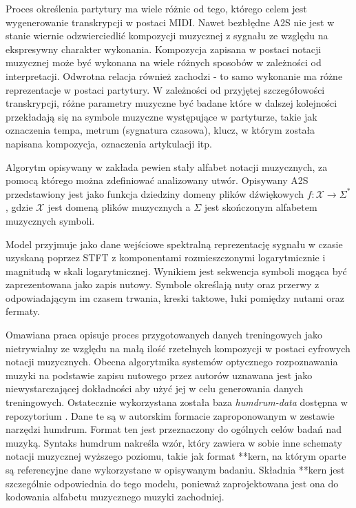 \documentclass[12pt,a4paper,twoside]{mwart}
\begin{document}
Proces określenia partytury ma wiele różnic od tego, którego celem jest wygenerowanie transkrypcji w postaci MIDI. Nawet bezbłędne A2S nie jest w stanie wiernie odzwierciedlić kompozycji muzycznej z sygnału ze względu na ekspresywny charakter wykonania. Kompozycja zapisana w postaci notacji muzycznej może być wykonana na wiele różnych sposobów w zależności od interpretacji. Odwrotna relacja również zachodzi - to samo wykonanie ma różne reprezentacje w postaci partytury. W zależności od przyjętej szczegółowości transkrypcji, różne parametry muzyczne być badane które w dalszej kolejności przekładają się na symbole muzyczne występujące w partyturze, takie jak oznaczenia tempa, metrum (sygnatura czasowa), klucz, w którym została napisana kompozycja, oznaczenia artykulacji itp.

Algorytm opisywany w \cite{Transcription:Pertus:NeuralNetwork} zakłada pewien stały alfabet notacji muzycznych, za pomocą którego można zdefiniować analizowany utwór. Opisywany A2S przedstawiony jest jako funkcja dziedziny domeny plików dźwiękowych $f : \mathcal{X} \rightarrow \Sigma^{\ast}$, gdzie $\mathcal{X}$ jest domeną plików muzycznych a $ \Sigma $ jest skończonym alfabetem muzycznych symboli.

Model przyjmuje jako dane wejściowe spektralną reprezentację sygnału w czasie uzyskaną poprzez STFT z komponentami rozmieszczonymi logarytmicznie i magnitudą w skali logarytmicznej. Wynikiem jest sekwencja symboli mogąca być zaprezentowana jako zapis nutowy. Symbole określają nuty oraz przerwy z odpowiadającym im czasem trwania, kreski taktowe, łuki pomiędzy nutami oraz fermaty.

Omawiana praca opisuje proces przygotowanych danych treningowych jako nietrywialny ze względu na małą ilość rzetelnych kompozycji w postaci cyfrowych notacji muzycznych. Obecna algorytmika systemów optycznego rozpoznawania muzyki na podstawie zapisu nutowego przez autorów uznawana jest jako niewystarczającej dokładności aby użyć jej w celu generowania danych treningowych. Ostatecznie wykorzystana została baza \textit{humdrum-data} dostępna w repozytorium \cite{Transcription:Sapp:Humdrum}. Dane te są w autorskim formacie zaproponowanym w zestawie narzędzi humdrum. Format ten jest przeznaczony do ogólnych celów badań nad muzyką. Syntaks humdrum nakreśla wzór, który zawiera w sobie inne schematy notacji muzycznej wyższego poziomu, takie jak format **kern, na którym oparte są referencyjne dane wykorzystane w opisywanym badaniu. Składnia **kern jest szczególnie odpowiednia do tego modelu, ponieważ zaprojektowana jest ona do kodowania alfabetu muzycznego muzyki zachodniej.
\end{document}
